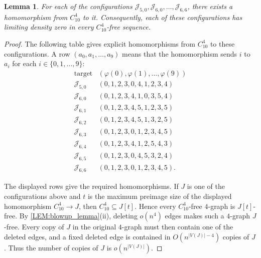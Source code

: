 \documentclass[10pt,a4paper]{article}
\theoremstyle{plain}
\newtheorem{lemma}[lemma]{Lemma}
\theoremstyle{definition}
\begin{document}
\begin{lemma}\label{LEM:C10-zero-density-configs}
For each of the configurations $\mathcal J_{5,0}, \mathcal J_{6,0},\ldots,\mathcal J_{6,6}$, there exists a homomorphism from $C_{10}^4$ to it.  Consequently, each of these configurations has limiting density zero in every $C_{10}^4$-free sequence.
\end{lemma}

\begin{proof}
The following table gives explicit homomorphisms from $C_{10}^4$ to these configurations.
A row $(a_0,a_1,\ldots,a_9)$ means that the homomorphism sends $i$ to $a_i$ for each $i\in\{0,1,\ldots,9\}$:
\[
\begin{array}{c|c}
\text{target} & (\varphi(0),\varphi(1),\ldots,\varphi(9))\\ \hline
\mathcal J_{5,0} & (0,1,2,3,0,4,1,2,3,4)\\
\mathcal J_{6,0} & (0,1,2,3,4,1,0,3,5,4)\\
\mathcal J_{6,1} & (0,1,2,3,4,5,1,2,3,5)\\
\mathcal J_{6,2} & (0,1,2,3,4,5,1,3,2,5)\\
\mathcal J_{6,3} & (0,1,2,3,0,1,2,3,4,5)\\
\mathcal J_{6,4} & (0,1,2,3,4,1,2,5,4,3)\\
\mathcal J_{6,5} & (0,1,2,3,0,4,5,3,2,4)\\
\mathcal J_{6,6} & (0,1,2,3,0,1,2,3,4,5).
\end{array}
\]

The displayed rows give the required homomorphisms.  If $J$ is one of the configurations above and $t$ is the maximum preimage size of the displayed homomorphism $C_{10}^4\to J$, then $C_{10}^4\subseteq J[t]$.  Hence every $C_{10}^4$-free $4$-graph is $J[t]$-free.  By \cref{LEM:blowup_lemma}\textup{(ii)}, deleting $o(n^4)$ edges makes such a $4$-graph $J$-free.  Every copy of $J$ in the original $4$-graph must then contain one of the deleted edges, and a fixed deleted edge is contained in $O(n^{|V(J)|-4})$ copies of $J$.  Thus the number of copies of $J$ is $o(n^{|V(J)|})$.
\end{proof}


\bigskip
\end{document}
